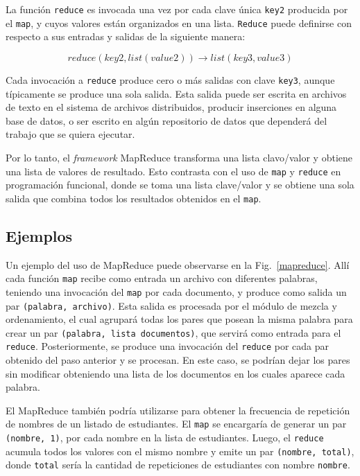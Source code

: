 \documentclass[conference]{IEEEtran}
\begin{document}
La función \texttt{reduce} es invocada una vez por cada clave única \texttt{key2} producida por el \texttt{map}, y cuyos valores están organizados en una lista.
\texttt{Reduce} puede definirse con respecto a sus entradas y salidas de la siguiente manera:

\begin{equation*}
reduce(key2, list(value2)) \rightarrow list(key3, value3)
\end{equation*}

Cada invocación a \texttt{reduce} produce cero o más salidas con clave \texttt{key3}, aunque típicamente se produce una sola salida.
Esta salida puede ser escrita en archivos de texto en el sistema de archivos distribuidos, producir inserciones en alguna base de datos, o ser escrito en algún repositorio de datos que dependerá del trabajo que se quiera ejecutar.


Por lo tanto, el \textit{framework} MapReduce transforma una lista clavo/valor y obtiene una lista de valores de resultado.
Esto contrasta con el uso de \texttt{map} y \texttt{reduce} en programación funcional, donde se toma una lista clave/valor y se obtiene una sola salida que combina todos los resultados obtenidos en el \texttt{map}.



\subsection{Ejemplos}

Un ejemplo del uso de MapReduce puede observarse en la Fig.~\ref{mapreduce}.
Allí cada función \texttt{map} recibe como entrada un archivo con diferentes palabras, teniendo una invocación del \texttt{map} por cada documento, y produce como salida un par \texttt{(palabra, archivo)}.
Esta salida es procesada por el módulo de mezcla y ordenamiento, el cual agrupará todas los pares que posean la misma palabra para crear un par \texttt{(palabra, lista documentos)}, que servirá como entrada para el \texttt{reduce}.
Posteriormente, se produce una invocación del \texttt{reduce} por cada par obtenido del paso anterior y se procesan.
En este caso, se podrían dejar los pares sin modificar obteniendo una lista de los documentos en los cuales aparece cada palabra.


El MapReduce también podría utilizarse para obtener la frecuencia de repetición de nombres de un listado de estudiantes.
El \texttt{map} se encargaría de generar un par \texttt{(nombre, 1)}, por cada nombre en la lista de estudiantes.
Luego, el \texttt{reduce} acumula todos los valores con el mismo nombre y emite un par \texttt{(nombre, total)}, donde \texttt{total} sería la cantidad de repeticiones de estudiantes con nombre \texttt{nombre}.
\end{document}
